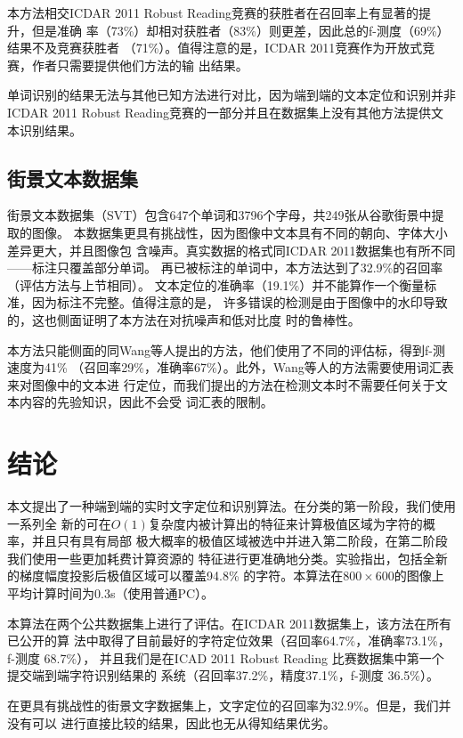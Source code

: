\documentclass[UTF8]{article}
\begin{document}
本方法相交ICDAR 2011 Robust Reading竞赛的获胜者在召回率上有显著的提升，但是准确
率（73\%）却相对获胜者（83\%）则更差，因此总的f-测度（69\%）结果不及竞赛获胜者
（71\%）。值得注意的是，ICDAR 2011竞赛作为开放式竞赛，作者只需要提供他们方法的输
出结果。

单词识别的结果无法与其他已知方法进行对比，因为端到端的文本定位和识别并非ICDAR
2011 Robust Reading竞赛的一部分并且在数据集上没有其他方法提供文本识别结果。

\subsection{街景文本数据集}

街景文本数据集（SVT）包含647个单词和3796个字母，共249张从谷歌街景中提取的图像。
本数据集更具有挑战性，因为图像中文本具有不同的朝向、字体大小差异更大，并且图像包
含噪声。真实数据的格式同ICDAR 2011数据集也有所不同——标注只覆盖部分单词。
再已被标注的单词中，本方法达到了32.9\%的召回率（评估方法与上节相同）。
文本定位的准确率（19.1\%）并不能算作一个衡量标准，因为标注不完整。值得注意的是，
许多错误的检测是由于图像中的水印导致的，这也侧面证明了本方法在对抗噪声和低对比度
时的鲁棒性。

本方法只能侧面的同Wang等人提出的方法，他们使用了不同的评估标，得到f-测速度为41\%
（召回率29\%，准确率67\%）。此外，Wang等人的方法需要使用词汇表来对图像中的文本进
行定位，而我们提出的方法在检测文本时不需要任何关于文本内容的先验知识，因此不会受
词汇表的限制。

\section{结论}

本文提出了一种端到端的实时文字定位和识别算法。在分类的第一阶段，我们使用一系列全
新的可在$O(1)$复杂度内被计算出的特征来计算极值区域为字符的概率，并且只有具有局部
极大概率的极值区域被选中并进入第二阶段，在第二阶段我们使用一些更加耗费计算资源的
特征进行更准确地分类。实验指出，包括全新的梯度幅度投影后极值区域可以覆盖94.8\%
的字符。本算法在$800 \times 600$的图像上平均计算时间为0.3s（使用普通PC）。

本算法在两个公共数据集上进行了评估。在ICDAR 2011数据集上，该方法在所有已公开的算
法中取得了目前最好的字符定位效果（召回率64.7\%，准确率73.1\%，f-测度 68.7\%），
并且我们是在ICAD 2011 Robust Reading 比赛数据集中第一个提交端到端字符识别结果的
系统（召回率37.2\%，精度37.1\%，f-测度 36.5\%）。

在更具有挑战性的街景文字数据集上，文字定位的召回率为32.9\%。但是，我们并没有可以
进行直接比较的结果，因此也无从得知结果优劣。
\end{document}
